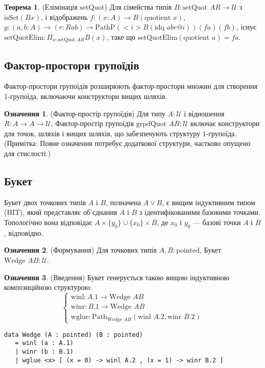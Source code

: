 \documentclass{article}
\theoremstyle{definition}
\newtheorem{theorem}{Теорема}
\newtheorem{definition}{Означення}
\begin{document}
\begin{theorem} (Елімінація \( \text{setQuot} \))
Для сімейства типів \( B : \text{setQuot } A R \to \mathcal{U} \) з \( \text{isSet}(B x) \),
і відображень \( f : (x : A) \to B(\text{quotient } x) \),
\( g : (a, b : A) \to (r : R a b) \to \text{PathP} (<i> B(\text{idq } a b r @ i)) (f a) (f b) \),
існує \( \text{setQuotElim} : \Pi_{x:\text{setQuot } A R} B(x) \), таке що \( \text{setQuotElim}(\text{quotient } a) = f a \).
\end{theorem}

\subsection{Фактор-простори групоїдів}
Фактор-простори групоїдів розширюють фактор-простори множин для створення 1-групоїда,
включаючи конструктори вищих шляхів.

\begin{definition} (Фактор-простір групоїдів)
Для типу \( A : \mathcal{U} \) і відношення \( R : A \to A \to \mathcal{U} \), Фактор-простір групоїдів \( \text{grpdQuot } A R : \mathcal{U} \) включає конструктори для точок, шляхів і вищих шляхів, що забезпечують структуру 1-групоїда. (Примітка: Повне означення потребує додаткової структури, частково опущено для стислості.)
\end{definition}

\subsection{Букет}
Букет двох точкових типів \( A \) і \( B \), позначена \( A \vee B \),
є вищим індуктивним типом (HIT), який представляє об’єднання \( A \)
і \( B \) з ідентифікованими базовими точками. Топологічно
вона відповідає \( A \times \{ y_0 \} \cup \{ x_0 \} \times B \),
де \( x_0 \) і \( y_0 \) — базові точки \( A \) і \( B \), відповідно.

\begin{definition} (Формування)
Для точкових типів \( A, B : \text{pointed} \), Букет \( \text{Wedge } A B : \mathcal{U} \).
\end{definition}

\begin{definition} (Введення)
Букет генерується такою вищою індуктивною композиційною структурою:
\[
\begin{cases}
\text{winl} : A.1 \to \text{Wedge } A B \\
\text{winr} : B.1 \to \text{Wedge } A B \\
\text{wglue} : \text{Path}_{\text{Wedge } A B} (\text{winl } A.2, \text{winr } B.2)
\end{cases}
\]
\begin{lstlisting}
data Wedge (A : pointed) (B : pointed)
   = winl (a : A.1)
   | winr (b : B.1)
   | wglue <x> [ (x = 0) -> winl A.2 , (x = 1) -> winr B.2 ]
\end{lstlisting}
\end{definition}
\end{document}
